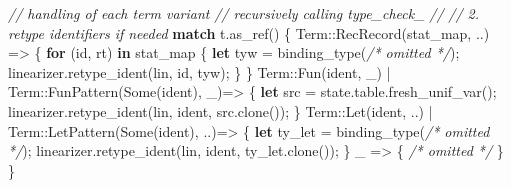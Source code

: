 \documentclass[
  a4paper,
  bibtex,
  english,
  nomenclature]{kthlatex/kththesis/kththesis}
\newenvironment{Shaded}{}{}
\newcommand{\CommentTok}[1]{\textcolor[rgb]{0.38,0.63,0.69}{\textit{#1}}}
\newcommand{\ConstantTok}[1]{\textcolor[rgb]{0.53,0.00,0.00}{#1}}
\newcommand{\KeywordTok}[1]{\textcolor[rgb]{0.00,0.44,0.13}{\textbf{#1}}}
\newcommand{\NormalTok}[1]{#1}
\newcommand{\OperatorTok}[1]{\textcolor[rgb]{0.40,0.40,0.40}{#1}}
\newcommand{\PreprocessorTok}[1]{\textcolor[rgb]{0.74,0.48,0.00}{#1}}
\begin{document}
\begin{codelisting}
\begin{Shaded}
\begin{Highlighting}[]
    \CommentTok{// handling of each term variant}
    \CommentTok{// recursively calling \textasciigrave{}type\_check\_\textasciigrave{}}
    \CommentTok{//}
    \CommentTok{// 2. retype identifiers if needed}
    \KeywordTok{match}\NormalTok{ t}\OperatorTok{.}\NormalTok{as\_ref() }\OperatorTok{\{}
      \PreprocessorTok{Term::}\NormalTok{RecRecord(stat\_map}\OperatorTok{,} \OperatorTok{..}\NormalTok{) }\OperatorTok{=\textgreater{}} \OperatorTok{\{}
        \KeywordTok{for}\NormalTok{ (id}\OperatorTok{,}\NormalTok{ rt) }\KeywordTok{in}\NormalTok{ stat\_map }\OperatorTok{\{}
          \KeywordTok{let}\NormalTok{ tyw }\OperatorTok{=}\NormalTok{ binding\_type(}\CommentTok{/* omitted */}\NormalTok{)}\OperatorTok{;}
\NormalTok{          linearizer}\OperatorTok{.}\NormalTok{retype\_ident(lin}\OperatorTok{,}\NormalTok{ id}\OperatorTok{,}\NormalTok{ tyw)}\OperatorTok{;}
        \OperatorTok{\}}
      \OperatorTok{\}}
      \PreprocessorTok{Term::}\NormalTok{Fun(ident}\OperatorTok{,}\NormalTok{ \_) }\OperatorTok{|}
      \PreprocessorTok{Term::}\NormalTok{FunPattern(}\ConstantTok{Some}\NormalTok{(ident)}\OperatorTok{,}\NormalTok{ \_)}\OperatorTok{=\textgreater{}} \OperatorTok{\{}
        \KeywordTok{let}\NormalTok{ src }\OperatorTok{=}\NormalTok{ state}\OperatorTok{.}\NormalTok{table}\OperatorTok{.}\NormalTok{fresh\_unif\_var()}\OperatorTok{;}
\NormalTok{        linearizer}\OperatorTok{.}\NormalTok{retype\_ident(lin}\OperatorTok{,}\NormalTok{ ident}\OperatorTok{,}\NormalTok{ src}\OperatorTok{.}\NormalTok{clone())}\OperatorTok{;}
      \OperatorTok{\}}
      \PreprocessorTok{Term::}\NormalTok{Let(ident}\OperatorTok{,} \OperatorTok{..}\NormalTok{) }\OperatorTok{|}
      \PreprocessorTok{Term::}\NormalTok{LetPattern(}\ConstantTok{Some}\NormalTok{(ident)}\OperatorTok{,} \OperatorTok{..}\NormalTok{)}\OperatorTok{=\textgreater{}} \OperatorTok{\{}
        \KeywordTok{let}\NormalTok{ ty\_let }\OperatorTok{=}\NormalTok{ binding\_type(}\CommentTok{/* omitted */}\NormalTok{)}\OperatorTok{;}
\NormalTok{        linearizer}\OperatorTok{.}\NormalTok{retype\_ident(lin}\OperatorTok{,}\NormalTok{ ident}\OperatorTok{,}\NormalTok{ ty\_let}\OperatorTok{.}\NormalTok{clone())}\OperatorTok{;}
      \OperatorTok{\}}
\NormalTok{      \_ }\OperatorTok{=\textgreater{}} \OperatorTok{\{} \CommentTok{/* omitted */} \OperatorTok{\}}
    \OperatorTok{\}}
\end{Highlighting}
\end{Shaded}

\end{codelisting}
\end{document}
